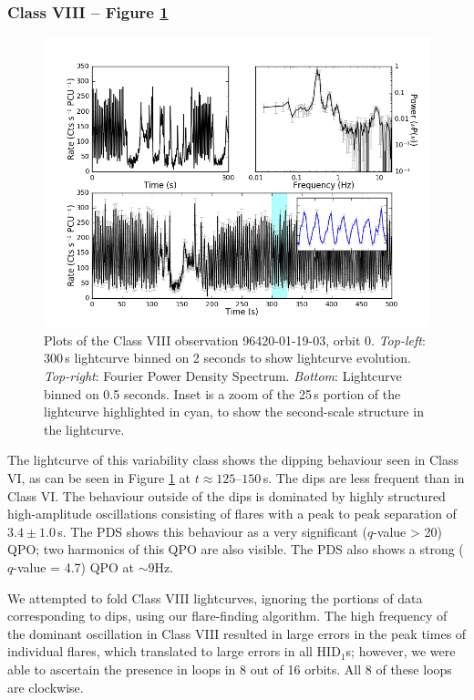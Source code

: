\subsubsection{Class VIII -- Figure \ref{fig:Omulti}}

\begin{figure}
    \includegraphics[width=0.8\columnwidth, trim = 0.6cm 0 3.9cm 0]{images/Omulti.png}
    \captionsetup{singlelinecheck=off}
    \caption{Plots of the Class VIII observation 96420-01-19-03, orbit 0.  \textit{Top-left}: 300\,s lightcurve binned on 2 seconds to show lightcurve evolution.  \textit{Top-right}: Fourier Power Density Spectrum.  \textit{Bottom}: Lightcurve binned on 0.5 seconds.  Inset is a zoom of the 25\,s portion of the lightcurve highlighted in cyan, to show the second-scale structure in the lightcurve.}
   \label{fig:Omulti}
\end{figure}

\par The lightcurve of this variability class shows the dipping behaviour seen in Class VI, as can be seen in Figure \ref{fig:Omulti} at $t\approx125$--$150$\,s.  The dips are less frequent than in Class VI.  The behaviour outside of the dips is dominated by highly structured high-amplitude oscillations consisting of flares with a peak to peak separation of $3.4\pm1.0$\,s.  The PDS shows this behaviour as a very significant ($q$-value > 20) QPO; two harmonics of this QPO are also visible.  The PDS also shows a strong ($q$-value = 4.7) QPO at $\sim9$Hz.
\par We attempted to fold Class VIII lightcurves, ignoring the portions of data corresponding to dips, using our flare-finding algorithm.  The high frequency of the dominant oscillation in Class VIII resulted in large errors in the peak times of individual flares, which translated to large errors in all HID$_1$s; however, we were able to ascertain the presence in loops in 8 out of 16 orbits.  All 8 of these loops are clockwise.

